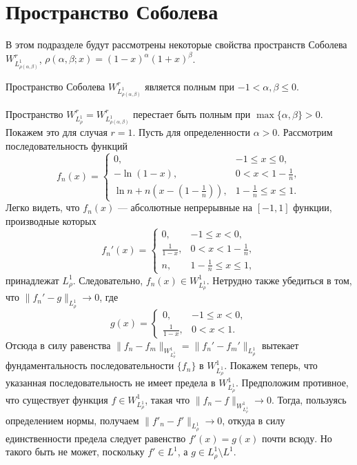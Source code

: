 \section{Пространство Соболева}
В этом подразделе будут рассмотрены некоторые свойства пространств Соболева $W^r_{L^1_{\rho(\alpha, \beta)}}$, $\rho(\alpha, \beta; x)=(1-x)^\alpha(1+x)^\beta$.

\begin{lemma}\label{mmg-complete-W1L1rho}
	Пространство Соболева $W^r_{L^1_{\rho(\alpha, \beta)}}$ является полным при $-1 < \alpha, \beta \le 0$.
\end{lemma}

Пространство $W^r_{L^1_\rho}=W^r_{L^1_{\rho(\alpha, \beta)}}$ перестает быть полным при $\max\{\alpha,\beta\} > 0$. Покажем это для случая $r=1$. Пусть для определенности $\alpha>0$. Рассмотрим последовательность функций
\begin{equation*}
	f_n(x)=
	\begin{cases}
		0, &-1 \le x \le 0,\\
		-\ln (1-x), &0<x<1-\frac{1}{n},\\
		\ln n + n(x-(1-\frac{1}{n})), &1-\frac{1}{n} \le x \le 1.
	\end{cases}
\end{equation*}
Легко видеть, что $f_n(x)$ --- абсолютные непрерывные на $[-1,1]$ функции, производные которых
\begin{equation*}
	f_n'(x)=
	\begin{cases}
		0, &-1 \le x < 0,\\
		\frac{1}{1-x}, &0<x<1-\frac{1}{n},\\
		n, &1-\frac{1}{n} \le x \le 1,
	\end{cases}
\end{equation*}
принадлежат $L^1_{\rho}$. Следовательно, $f_n(x) \in W^1_{L^1_{\rho}}$.
Нетрудно также убедиться в том, что $\|f_n'-g\|_{L^1_\rho} \to 0$, где
\begin{equation*}
	g(x)=
	\begin{cases}
		0, &-1 \le x < 0,\\
		\frac{1}{1-x}, &0<x<1.
	\end{cases}	
\end{equation*}
Отсюда в силу равенства $\|f_n-f_m\|_{W^1_{L^1_{\rho}}} = \|f_n'-f_m'\|_{L^1_\rho}$ вытекает фундаментальность последовательности $\{f_n\}$ в $W^1_{L^1_{\rho}}$. Покажем теперь, что указанная последовательность не имеет предела в $W^1_{L^1_{\rho}}$. Предположим противное, что существует функция $f \in W^1_{L^1_{\rho}}$, такая что $\|f_n-f\|_{W^1_{L^1_{\rho}}} \to 0$. Тогда, пользуясь определением нормы, получаем $\|f'_n-f'\|_{L^1_{\rho}} \to 0$, откуда в силу единственности предела следует равенство $f'(x)=g(x)$ почти всюду. Но такого быть не может, поскольку $f' \in L^1$, а $g \in L^1_\rho \setminus L^1$.


